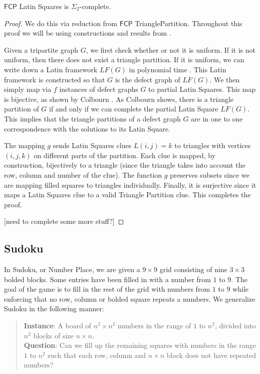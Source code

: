 \documentclass[runningheads,a4paper]{llncs}
\begin{document}
\begin{theorem}
$\mathsf{FCP}$ Latin Squares is $\Sigma_2$-complete.
\end{theorem}

\begin{proof}
We do this via reduction from $\mathsf{FCP}$ TrianglePartition. Throughout this proof we will be using constructions and results from \cite{colbourn1984complexity}.

Given a tripartite graph $G$, we first check whether or not it is uniform. If it is not uniform, then there does not exist a triangle partition. If it is uniform, we can write down a Latin framework $LF(G)$ in polynomial time \cite{colbourn1984complexity}. This Latin framework is constructed so that $G$ is the defect graph of $LF(G)$. We then simply map via $f$ instances of defect graphs $G$ to partial Latin Squares. This map is bijective, as shown by Colbourn \cite{colbourn1984complexity}. As Colbourn shows, there is a triangle partition of $G$ if and only if we can complete the partial Latin Square $LF(G)$. This implies that the triangle partitions of a defect graph $G$ are in one to one correspondence with the solutions to its Latin Square. 

The mapping $g$ sends Latin Squares clues $L(i,j) = k$ to triangles with vertices $(i,j,k)$ on different parts of the partition. Each clue is mapped, by construction, bijectively to a triangle (since the triangle takes into account the row, column and number of the clue). The function $g$ preserves subsets since we are mapping filled squares to triangles individually. Finally, it is surjective since it maps a Latin Squares clue to a valid Triangle Partition clue. This completes the proof.

[need to complete some more stuff?]
\end{proof}

\subsection{Sudoku}

In Sudoku, or Number Place, we are given a $9 \times 9$ grid consisting of nine $3 \times 3$ bolded blocks. Some entries have been filled in with a number from $1$ to $9$. The goal of the game is to fill in the rest of the grid with numbers from $1$ to $9$ while enforcing that no row, column or bolded square repeats a numbers. We generalize Sudoku in the following manner:

\begin{quote}
\textbf{Instance}: A board of $n^2 \times n^2$ numbers in the range of $1$ to $n^2$, divided into $n^2$ blocks of size $n \times n$.\\
\textbf{Question}: Can we fill up the remaining squares with numbers in the range $1$ to $n^2$ such that each row, column and $n \times n$ block does not have repeated numbers?
\end{quote}
\end{document}
